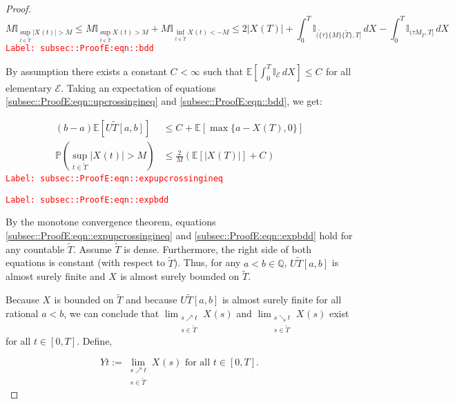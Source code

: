 \documentclass[12pt]{article}
\newcommand{\mb}{\mathbb}
\newcommand{\mc}{\mathcal}
\newcommand{\te}{\text}
\newcommand{\tr}{\textcolor{red}}
\newcommand{\labe}[1]{\tr{\texttt{Label: #1}}}
\newcommand{\ind}{\hspace{24pt}}
\newcommand{\pr}{\mb{P}}							%
\newcommand{\ex}[1]{\mb{E}\left[#1\right]}			%
\newcommand{\T}{T}								%
\renewcommand{\t}{t}							%
\renewcommand{\tt}{s}							%
\newcommand{\X}{X}								%
\newcommand{\cind}[1]{_{#1}}					%
\newcommand{\tp}[1]{(#1)}						%
\newcommand{\tip}[1]{#1}						%
\newcommand{\const}{C}							%
\newcommand{\alt}[1]{\widetilde{#1}}			%
\newcommand{\indx}[1]{_{#1}}					%
\newcommand{\XX}{Y}								%
\newcommand{\rt}{\tau}							%
\newcommand{\evnt}{\mc{E}}						%
\newcommand{\Tset}{\alt{T}}						%
\newcommand{\upcrs}{U}							%
\begin{document}
\begin{proof}
\begin{equation}
M\mb{I}_{\sup_{\t\in\Tset}|\X\cind{}\tp{\t}| > M} \leq M\mb{I}_{\sup_{\t\in\Tset}\X\cind{}\tp{\t} > M} + M\mb{I}_{\inf_{\t\in\Tset}\X\cind{}\tp{\t} < -M} \leq 2|\X\cind{}\tp{\T}| + \int_0^\T \mb{I}_{(\alt\{\rt\}\{M\}\{\Tset\},\T]}\,d\X\cind{}\tip{} - \int_0^\T \mb{I}_{(\rt{M}_{\Tset},\T]}\,d\X\cind{}\tip{}
\label{subsec::ProofE:eqn::bdd}
\end{equation}
\labe{subsec::ProofE:eqn::bdd}

By assumption there exists a constant \(\const\indx{} < \infty\) such that \(\ex{\int_0^\T \mb{I}_{\evnt}\,d\X\cind{}\tip{}} \leq \const\indx{}\) for all elementary \(\evnt{}\). Taking an expectation of equations \eqref{subsec::ProofE:eqn::upcrossingineq} and \eqref{subsec::ProofE:eqn::bdd}, we get:

\begin{align}
(b-a)\ex{\upcrs{\Tset}[a,b]} &\leq \const\indx{} + \ex{\max\{a-\X\cind{}\tp{\T},0\}}
\label{subsec::ProofE:eqn::expupcrossingineq}\\
\pr\left(\sup_{\t\in\Tset} |\X\cind{}\tp{\t}| > M\right) &\leq \frac{2}{M}\left(\ex{|\X\cind{}\tp{\T}|} + \const\indx{}\right)
\label{subsec::ProofE:eqn::expbdd}
\end{align}
\labe{subsec::ProofE:eqn::expupcrossingineq}

\labe{subsec::ProofE:eqn::expbdd}

By the monotone convergence theorem, equations \eqref{subsec::ProofE:eqn::expupcrossingineq} and \eqref{subsec::ProofE:eqn::expbdd} hold for any countable \(\Tset\). Assume \(\Tset\) is dense. Furthermore, the right side of both equations is constant (with respect to \(\Tset\)). Thus, for any \(a < b \in \mb{Q}\), \(\upcrs{\Tset}[a,b]\) is almost surely finite and \(\X\cind{}\tip{}\) is almost surely bounded on \(\Tset\).

\ind Because \(\X\cind{}\tip{}\) is bounded on \(\Tset\) and because \(\upcrs{\Tset}[a,b]\) is almost surely finite for all rational \(a < b\), we can conclude that \(\lim_{\substack{\tt \nearrow \t\\ \tt \in \Tset}} \X\cind{}\tp{\tt}\) and \(\lim_{\substack{\tt \searrow \t\\ \tt \in \Tset}} \X\cind{}\tp{\tt}\) exist for all \(\t \in [0,\T]\). Define,

\[\XX{}{\t} := \lim_{\substack{\tt \nearrow \t\\\tt \in \Tset}} \X\cind{}\tp{\tt}\te{ for all } \t \in [0,\T].\]


\end{proof}
\end{document}
